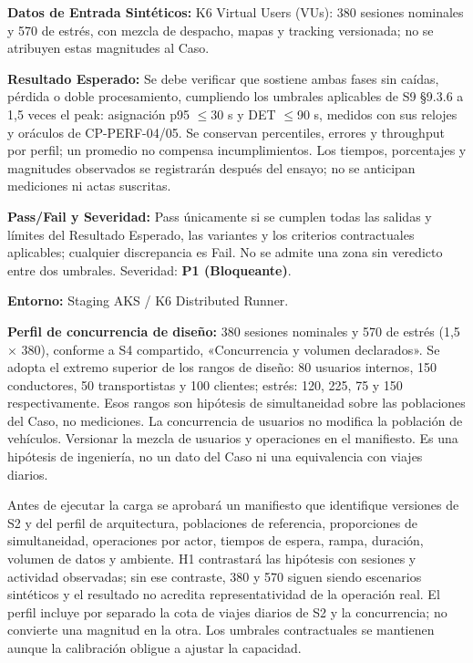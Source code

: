 \par\noindent \textbf{Datos de Entrada Sintéticos:} K6 Virtual Users (VUs): 380 sesiones nominales y 570 de estrés, con mezcla de despacho, mapas y tracking versionada; no se atribuyen estas magnitudes al Caso.\par
\par\noindent \textbf{Resultado Esperado:} Se debe verificar que sostiene ambas fases sin caídas, pérdida o doble procesamiento, cumpliendo los umbrales aplicables de S9 §9.3.6 a 1,5 veces el peak: asignación p95 \(\le\)30 s y DET \(\le\)90 s, medidos con sus relojes y oráculos de CP-PERF-04/05. Se conservan percentiles, errores y throughput por perfil; un promedio no compensa incumplimientos. Los tiempos, porcentajes y magnitudes observados se registrarán después del ensayo; no se anticipan mediciones ni actas suscritas.\par
\par\noindent \textbf{Pass/Fail y Severidad:} Pass únicamente si se cumplen todas las salidas y límites del Resultado Esperado, las variantes y los criterios contractuales aplicables; cualquier discrepancia es Fail. No se admite una zona sin veredicto entre dos umbrales. Severidad: \textbf{P1 (Bloqueante)}.\par
\par\noindent \textbf{Entorno:} Staging AKS / K6 Distributed Runner.\par

\par\noindent \textbf{Perfil de concurrencia de diseño:} 380 sesiones nominales y 570 de estrés (1,5 × 380), conforme a S4 compartido, «Concurrencia y volumen declarados». Se adopta el extremo superior de los rangos de diseño: 80 usuarios internos, 150 conductores, 50 transportistas y 100 clientes; estrés: 120, 225, 75 y 150 respectivamente. Esos rangos son hipótesis de simultaneidad sobre las poblaciones del Caso, no mediciones. La concurrencia de usuarios no modifica la población de vehículos. Versionar la mezcla de usuarios y operaciones en el manifiesto. Es una hipótesis de ingeniería, no un dato del Caso ni una equivalencia con viajes diarios.\par

\par\noindent Antes de ejecutar la carga se aprobará un manifiesto que identifique versiones de S2 y del perfil de arquitectura, poblaciones de referencia, proporciones de simultaneidad, operaciones por actor, tiempos de espera, rampa, duración, volumen de datos y ambiente. H1 contrastará las hipótesis con sesiones y actividad observadas; sin ese contraste, 380 y 570 siguen siendo escenarios sintéticos y el resultado no acredita representatividad de la operación real. El perfil incluye por separado la cota de viajes diarios de S2 y la concurrencia; no convierte una magnitud en la otra. Los umbrales contractuales se mantienen aunque la calibración obligue a ajustar la capacidad.\par


